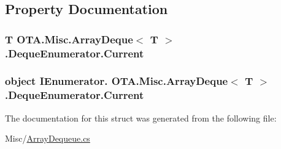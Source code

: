 \subsection{Property Documentation}
\hypertarget{struct_o_t_a_1_1_misc_1_1_array_deque_1_1_deque_enumerator_ae49e9bafbdf32aeee0662944ebe4ad8b}{}
\subsubsection[{Current}]{\setlength{\rightskip}{0pt plus 5cm}T {\bf O\+T\+A.\+Misc.\+Array\+Deque}$<$ T $>$.Deque\+Enumerator.\+Current\hspace{0.3cm}{\ttfamily [get]}}\label{struct_o_t_a_1_1_misc_1_1_array_deque_1_1_deque_enumerator_ae49e9bafbdf32aeee0662944ebe4ad8b}
\hypertarget{struct_o_t_a_1_1_misc_1_1_array_deque_1_1_deque_enumerator_a41254c45c70395bb1a2795835260d602}{}
\subsubsection[{Current}]{\setlength{\rightskip}{0pt plus 5cm}object I\+Enumerator. {\bf O\+T\+A.\+Misc.\+Array\+Deque}$<$ T $>$.Deque\+Enumerator.\+Current\hspace{0.3cm}{\ttfamily [get]}}\label{struct_o_t_a_1_1_misc_1_1_array_deque_1_1_deque_enumerator_a41254c45c70395bb1a2795835260d602}


The documentation for this struct was generated from the following file\+:\begin{DoxyCompactItemize}
\item 
Misc/\hyperlink{_array_dequeue_8cs}{Array\+Dequeue.\+cs}\end{DoxyCompactItemize}
